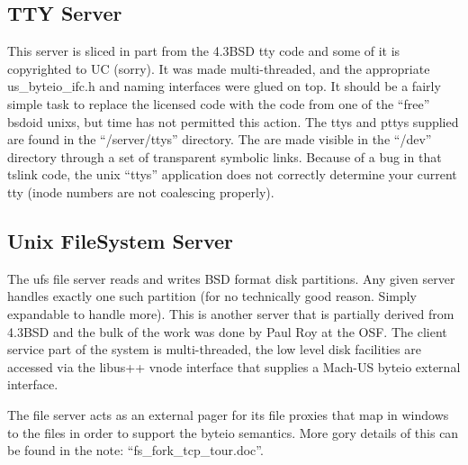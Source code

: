 \subsection{TTY Server}
This server is sliced in part from the 4.3BSD tty code and some of it
is copyrighted to UC (sorry).  It was made multi-threaded, and the
appropriate us\_byteio\_ifc.h and naming interfaces were glued
on top.  It should be a fairly simple task to replace the licensed
code with the code from one of the ``free'' bsdoid
unixs, but time has not permitted this action.  The ttys and pttys
supplied are found in the ``/server/ttys'' directory.  The are made
visible in the ``/dev'' directory through a set of transparent symbolic
links.  Because of a bug in that tslink code, the unix ``ttys'' application
does not correctly determine your current tty (inode numbers are
not coalescing properly).

\subsection{Unix FileSystem Server}
The ufs file server reads and writes BSD format disk
partitions.  Any given server handles exactly one such partition
(for no technically good reason.  Simply expandable to handle
more).  This is another server that is partially derived from 4.3BSD and the
bulk of the work was done by Paul Roy at the OSF.  The client service part of
the system is multi-threaded, the low level disk facilities are accessed via
the libus++ vnode interface that supplies a Mach-US byteio external interface.

The file server acts as an external pager for its file proxies that
map in windows to the files in order to support the byteio semantics.
More gory details
of this can be found in the note: ``fs\_fork\_tcp\_tour.doc''.



